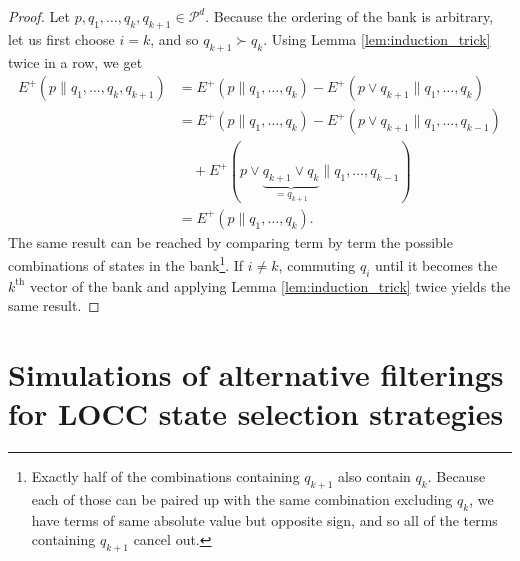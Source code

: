 \begin{proof}
    Let $p, q_1, \dots, q_k, q_{k+1} \in \mathcal{P}^d$.  Because the ordering of the bank is arbitrary, let us first choose $i = k$, and so $q_{k+1} \succ q_k$. Using Lemma \ref{lem:induction_trick} twice in a row, we get
    \begin{align}
        E^+(p \parallel q_1, \dots, q_k, q_{k+1}) &= E^+(p \parallel q_1, \dots, q_k) - E^+(p \vee q_{k+1} \parallel q_1, \dots, q_k)\\
                                                  &= E^+(p \parallel q_1, \dots, q_k) - E^+(p \vee q_{k+1} \parallel q_1, \dots, q_{k-1})\nonumber\\
                                                  &\quad + E^+(p \vee \underbrace{q_{k+1} \vee q_k}_{= q_{k+1}} \parallel q_1, \dots, q_{k-1})\\
                                                  &= E^+(p \parallel q_1, \dots, q_k).
    \end{align}
    The same result can be reached by comparing term by term the possible combinations of states in the bank\footnote{Exactly half of the combinations containing $q_{k+1}$ also contain $q_k$. Because each of those can be paired up with the same combination excluding $q_k$, we have terms of same absolute value but opposite sign, and so all of the terms containing $q_{k+1}$ cancel out.}. If $i \neq k$, commuting $q_i$ until it becomes the $k^\text{th}$ vector of the bank and applying Lemma \ref{lem:induction_trick} twice yields the same result. 
\end{proof}



\newpage

\section{Simulations of alternative filterings for LOCC state selection strategies} \label{app:alternative_filterings}

\setcounter{equation}{0}

